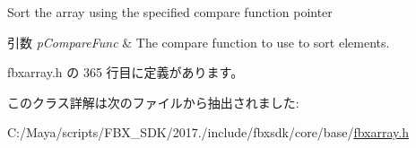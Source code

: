 Sort the array using the specified compare function pointer 
\begin{DoxyParams}{引数}
{\em p\+Compare\+Func} & The compare function to use to sort elements. \\
\hline
\end{DoxyParams}


 fbxarray.\+h の 365 行目に定義があります。



このクラス詳解は次のファイルから抽出されました\+:\begin{DoxyCompactItemize}
\item 
C\+:/\+Maya/scripts/\+F\+B\+X\+\_\+\+S\+D\+K/2017./include/fbxsdk/core/base/\hyperlink{fbxarray_8h}{fbxarray.\+h}\end{DoxyCompactItemize}
